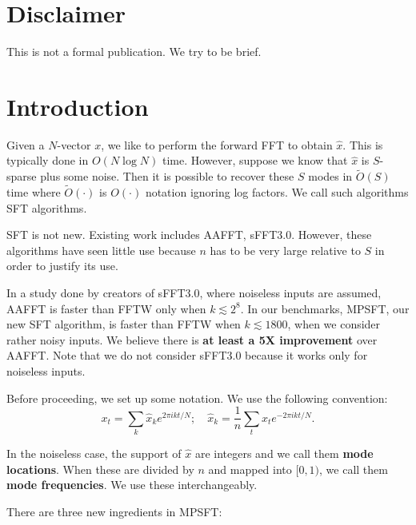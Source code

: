 \documentclass[10pt]{article}
\begin{document}
\pagestyle{plain}
\maketitle

\section*{Disclaimer}
This is not a formal publication. We try to be brief.

\section{Introduction}
Given a $N$-vector $x$, we like to perform the forward FFT to obtain $\hat{x}$. This is typically done in $O(N \log N)$ time. However, suppose we know that $\hat{x}$ is $S$-sparse plus some noise. Then it is possible to recover these $S$ modes in $\tilde{O}(S)$ time where $\tilde{O}(\cdot)$ is $O(\cdot)$ notation ignoring log factors. We call such algorithms SFT algorithms.

SFT is not new. Existing work includes AAFFT\cite{iwen2007empirical}, sFFT3.0\cite{hassanieh2012simple, hassanieh2012nearly}. However, these algorithms have seen little use because $n$ has to be very large relative to $S$ in order to justify its use.

In a study done by creators of sFFT3.0, where noiseless inputs are assumed, AAFFT is faster than FFTW\cite{FFTW05} only when $k\lesssim 2^8$. In our benchmarks, MPSFT, our new SFT algorithm, is faster than FFTW when $k \lesssim 1800$, when we consider rather noisy inputs. We believe there is \textbf{at least a 5X improvement} over AAFFT. Note that we do not consider sFFT3.0 because it works only for noiseless inputs.

Before proceeding, we set up some notation. We use the following convention:
$$x_t = \sum_k \hat{x}_k e^{2\pi i kt/N}; \quad \hat{x}_k =\frac{1}{n} \sum_t x_t e^{-2\pi i k t/N}.$$

In the noiseless case, the support of $\hat{x}$ are integers and we call them \textbf{mode locations}. When these are divided by $n$ and mapped into $[0,1)$, we call them \textbf{mode frequencies}. We use these interchangeably.

There are three new ingredients in MPSFT:
\end{document}
